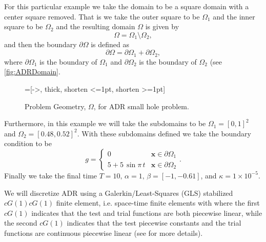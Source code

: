    For this particular example we take the domain to be a square domain with a
    center square removed. That is we take the outer square to be $\Omega_1$ and
    the inner square to be $\Omega_2$ and the resulting domain $\Omega$ is given
    by
    \begin{equation}
        \Omega = \Omega_1\setminus \Omega_2,
        \label{eq:ADRDomain}
    \end{equation}
    and then the boundary $\partial \Omega$ is defined as
    \begin{equation}
        \partial \Omega = \partial \Omega_1 + \partial \Omega_2,
        \label{eq:ADRBoundary}
    \end{equation}
    where $\partial \Omega_1$ is the boundary of $\Omega_1$ and $\partial
    \Omega_2$ is the boundary of $\Omega_2$ (see \autoref{fig:ADRDomain}.

    \begin{figure}[h]
        \centering
        =[->, thick, shorten <=1pt, shorten >=1pt]
        \caption{Problem Geometry, $\Omega$, for ADR small hole problem.}
        \label{fig:ADRDomain}
    \end{figure}

    Furthermore, in this example we will take the subdomains to be $\Omega_1 =
    [0,1]^2$ and $\Omega_2 = [0.48,0.52]^2$. With these subdomains defined we
    take the boundary condition to be
    \begin{equation}
        g = \begin{cases}
            0   &\mathbf{x} \in \partial \Omega_1 \\
            5 + 5\, \sin \pi\, t  &\mathbf{x} \in \partial \Omega_2
        \end{cases}.
        \label{eq:ADRBCs}
    \end{equation}
    Finally we take the final time $T=10,\, \alpha=1,\, \beta = \left[ -1,
    -0.61 \right]$, and $\kappa = 1\times10^{-5}$.

    We will discretize ADR using a Galerkin\slash Least-Squares (GLS) stabilized
    $cG(1)cG(1)$ finite element, i.e. space-time finite elements with where the
    first $cG(1)$ indicates that the test and trial functions are both piecewise
    linear, while the second $cG(1)$ indicates that the test piecewise constants
    and the trial functions are continuous piecewise linear (see
    \cite{Hoffman2006a} for more details).

